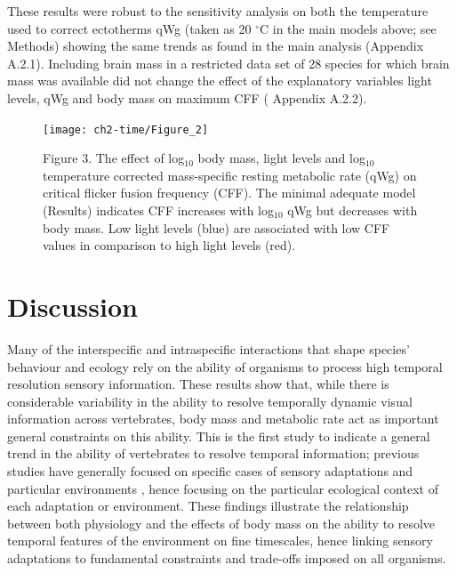 These results were robust to the sensitivity analysis on both the temperature used to correct ectotherms qWg (taken as 20 $^{\circ}$C in the main models above; see Methods) showing the same trends as found in the main analysis (Appendix A.2.1). Including brain mass in a restricted data set of 28 species for which brain mass was available did not change the effect of the explanatory variables light levels, qWg and body mass on maximum CFF ( Appendix A.2.2).


\begin{figure}[h!]
  \centering
  \texttt{[image: ch2-time/Figure\_2]}
  \caption[ ]{Figure 3. The effect of  log$_10$ body mass, light levels and log$_10$ temperature corrected mass-specific resting metabolic rate (qWg) on critical flicker fusion frequency (CFF). The minimal adequate model (Results) indicates CFF increases with log$_10$ qWg but decreases with body mass. Low light levels (blue) are associated with low CFF values in comparison to high light levels (red).}
  \label{fig:Figure 3.}
\end{figure}


\section{Discussion}
Many of the interspecific and intraspecific interactions that shape species' behaviour and ecology rely on the ability of organisms to process high temporal resolution sensory information. These results show that, while there is considerable variability in the ability to resolve temporally dynamic visual information across vertebrates, body mass and metabolic rate act as important general constraints on this ability. This is the first study to indicate a general trend in the ability of vertebrates to resolve temporal information; previous studies have generally focused on specific cases of sensory adaptations \citep{fritsches2005warm} and particular environments \citep{frank1999comparative,frank2012light}, hence focusing on the particular ecological context of each adaptation or environment. These findings illustrate the relationship between both physiology and the effects of body mass on the ability to resolve temporal features of the environment on fine timescales, hence linking sensory adaptations to fundamental constraints and trade-offs imposed on all organisms.


